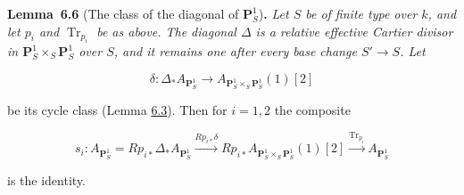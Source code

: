 \documentclass[11pt]{article}
\newenvironment{bpstatement}[2]{\par\addvspace{0.6\baselineskip}\noindent\textbf{#1}#2\textbf{.}\enspace\ignorespaces}
  {\par\addvspace{0.4\baselineskip}}
\newenvironment{bpstatementit}[2]{\begin{bpstatement}{#1}{#2}\itshape\ignorespaces}{\end{bpstatement}}
\begin{document}
\label{bp531}%
\begin{bpstatementit}{Lemma~6.6}{ (The class of the diagonal of $\mathbf P^1_S$)}
Let \(S\) be of finite type over \(k\), and let \(p_i\) and \(\operatorname{Tr}_{p_i}\) be as above. The diagonal \(\Delta\) is a relative effective Cartier divisor in \(\mathbf P^1_S\times_S\mathbf P^1_S\) over \(S\), and it remains one after every base change \(S'\to S\). Let

\[
\delta:\Delta_*A_{\mathbf P^1_S}\longrightarrow
A_{\mathbf P^1_S\times_S\mathbf P^1_S}(1)[2]
\]

be its cycle class (Lemma \hyperref[bp523]{6.3}). Then for \(i=1,2\) the composite

\[
s_i:A_{\mathbf P^1_S}=Rp_{i*}\Delta_*A_{\mathbf P^1_S}
\xrightarrow{Rp_{i*}\delta}
Rp_{i*}A_{\mathbf P^1_S\times_S\mathbf P^1_S}(1)[2]
\xrightarrow{\operatorname{Tr}_{p_i}}A_{\mathbf P^1_S}
\tag{6.6}
\]

is the identity.
\end{bpstatementit}
\end{document}
